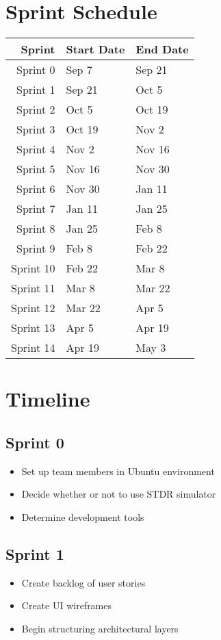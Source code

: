 \section{Sprint Schedule}
\begin{center}
	\begin{tabular}{r l l}
		Sprint & Start Date & End Date \\ \hline
		Sprint 0 & Sep 7 & Sep 21 \\
		Sprint 1 & Sep 21 & Oct 5 \\
		Sprint 2 & Oct 5 & Oct 19 \\
		Sprint 3 & Oct 19 & Nov 2 \\
		Sprint 4 & Nov 2 & Nov 16 \\
		Sprint 5 & Nov 16 & Nov 30 \\
		Sprint 6 & Nov 30 & Jan 11 \\
		Sprint 7 & Jan 11 & Jan 25 \\
		Sprint 8 & Jan 25 & Feb 8 \\
		Sprint 9 & Feb 8 & Feb 22 \\
		Sprint 10 & Feb 22 & Mar 8 \\
		Sprint 11 & Mar 8 & Mar 22 \\
		Sprint 12 & Mar 22 & Apr 5 \\
		Sprint 13 & Apr 5 & Apr 19 \\
		Sprint 14 & Apr 19 & May 3 \\
	\end{tabular}
\end{center}

\section{Timeline}

\subsection{Sprint 0}
\begin{itemize}
	\item Set up team members in Ubuntu environment
	\item Decide whether or not to use STDR simulator 
 	\item Determine development tools
\end{itemize}

\subsection{Sprint 1}
\begin{itemize}
	\item Create backlog of user stories
	\item Create UI wireframes
 	\item Begin structuring architectural layers
\end{itemize}

